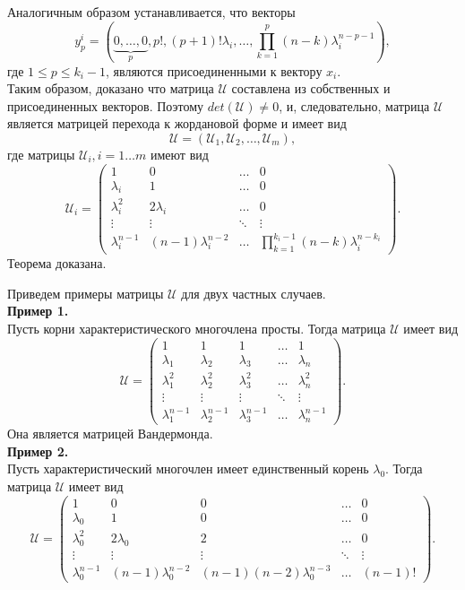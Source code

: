 Аналогичным образом устанавливается, что векторы 
$$
y^i_p = \left(\underbrace{0, \dots, 0}_{{p}}, p!, (p+1)! \lambda_i, \dots, \prod_{k=1}^p(n-k)\lambda_i ^{n-p-1} \right),
$$
где $1 \le p \le {k_i-1}$, являются присоединенными к вектору $x_i$. \\
Таким образом, доказано что матрица $\mathcal{U}$ составлена из собственных и присоединенных векторов. Поэтому $det(\mathcal{U}) \ne 0$, и, следовательно, матрица $\mathcal{U}$ является матрицей перехода к жордановой форме и имеет вид 
$$
\mathcal{U} = \left( \mathcal{U}_1, \mathcal{U}_2, \dots, \mathcal{U}_m \right),
$$
где матрицы $\mathcal{U}_i, i=1 \dots m$ имеют вид
$$
\mathcal{U}_i = \begin{pmatrix}
1 & 0 & \dots & 0 \\
\lambda_i & 1 & \dots & 0 \\ 
\lambda_i^2 & 2\lambda_i & \dots & 0 \\
\vdots & \vdots & \ddots & \vdots \\
\lambda_i^{n-1} & (n-1)\lambda_i^{n-2} & \dots & \prod_{k=1}^{k_i-1}(n-k)\lambda_i^{n-k_i}
\end{pmatrix}.
$$
Теорема доказана. 

Приведем примеры матрицы $\mathcal{U}$ для двух частных случаев.  \\
\textbf{Пример 1.} \\
Пусть корни характеристического многочлена просты. Тогда матрица $\mathcal{U}$ имеет вид
$$
\mathcal{U} = 
\begin{pmatrix}
	1 & 1 & 1 & \dots & 1 \\
	\lambda_1 & \lambda_2 & \lambda_3 & \dots & \lambda_n \\
	\lambda_1 ^ 2 & \lambda_2 ^2 & \lambda_3 ^2 & \dots & \lambda_n ^2 \\
	\vdots & \vdots & \vdots & \ddots & \vdots \\
	\lambda_1 ^{n-1} & \lambda_2 ^{n-1} &\lambda_3 ^{n-1} & \dots & \lambda_n ^{n-1}
\end{pmatrix}.
$$
Она является матрицей Вандермонда. \\
\textbf{Пример 2.}\\
Пусть характеристический многочлен имеет единственный корень $\lambda_0$. Тогда матрица $\mathcal{U}$ имеет вид
$$
\mathcal{U} = 
\begin{pmatrix}
	1 & 0 & 0 & \dots & 0 \\
	\lambda_0 & 1 & 0 & \dots & 0 \\
	\lambda_0 ^ 2 & 2 \lambda_0 & 2 & \dots & 0 \\
	\vdots & \vdots & \vdots & \ddots & \vdots \\
	\lambda_0 ^{n-1} & (n-1)\lambda_0^{n-2} & (n-1)(n-2)\lambda_0^{n-3} & \dots & (n-1)!
\end{pmatrix}.
$$